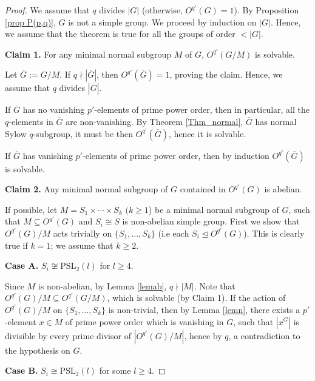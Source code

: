 \documentclass[11pt, a4paper]{article}
\numberwithin{equation}{section}
\theoremstyle{plain} %
\begin{document}
\begin{proof} We assume that $q$ divides $|G|$ (otherwise, $O^{q'}(G)=1$).  By Proposition \ref{prop P(p,q)}, $G$ is not a simple group. We proceed by induction on $|G|$. Hence, we assume that the theorem is true for all the groups of order $<|G|$. 

\noindent\textbf{Claim 1.} For any minimal normal subgroup $M$ of $G$, $O^{q'}(G/M)$ is solvable. 

Let $\overline{G}:=G/M$. If $q\nmid |\overline{G}|$, then $O^{q'}(\overline{G})=1$, proving the claim. Hence, we assume that $q$ divides $|\overline{G}|$. 



If $\overline{G}$ has no vanishing $p'$-elements of prime power order, then in particular, all the $q$-elements in $\overline{G}$ are non-vanishing. By Theorem \ref{Thm_normal}, $\overline{G}$ has normal Sylow $q$-subgroup, it must be then $O^{q'}(\overline{G})$, hence it is solvable. 

If $\overline{G}$ has vanishing $p'$-elements of prime power order, then by induction $O^{q'}(\overline{G})$ is solvable. 


\noindent\textbf{Claim 2.} Any minimal normal subgroup of $G$ contained in $O^{q'}(G)$ is abelian. 


If possible, let $M=S_1\times \cdots \times S_k$ $(k\ge 1$) be a minimal normal subgroup of $G$, such that $M\subseteq O^{q'}(G)$ and $S_i\cong S$ is non-abelian simple group. First we show that $O^{q'}(G)/M$ acts trivially on $\{S_1,\ldots, S_k\}$ (i.e each $S_i\trianglelefteq O^{q'}(G)$). This is clearly true if $k=1$; we assume that $k\ge 2$.  %

\textbf{Case A.} $S_i\not\cong \mathrm{PSL}_2(l)$ for $l\ge 4$. 

Since $M$ is non-abelian, by Lemma \ref{lemab}, $q\nmid |M|$. Note that $O^{q'}(G)/M\subseteq O^{q'}(G/M)$, which is solvable (by Claim 1). If the action of $O^{q'}(G)/M$ on $\{S_1,\ldots, S_k\}$ is non-trivial, then by Lemma \ref{lemn}, there exists a $p'$-element $x\in M$ of prime power order which is vanishing in $G$, such that $|x^G|$ is divisible by every prime divisor of $|O^{q'}(G)/M|$, hence by $q$, a contradiction to the hypothesis on $G$. 



\vskip2mm
\textbf{Case B.} $S_i\cong \mathrm{PSL}_2(l)$ for some $l\ge 4$. 


\end{proof}
\end{document}
